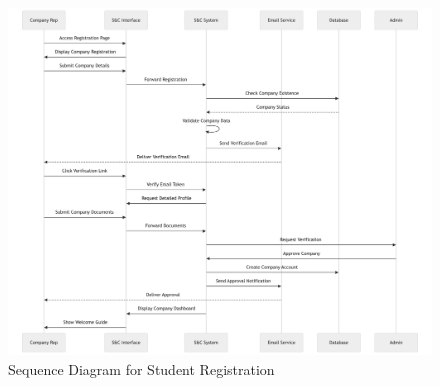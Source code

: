 \begin{figure}[H]
    \begin{center}
        \includegraphics[width=1.15\linewidth, height=\paperheight, keepaspectratio=true]{JhaBhatiaSharma/Images/Sequence Diagrams/StudentRegistration.png}
        \caption{Sequence Diagram for Student Registration}
        \label{fig:signup_as_ED_seqd}%
    \end{center}
\end{figure}

